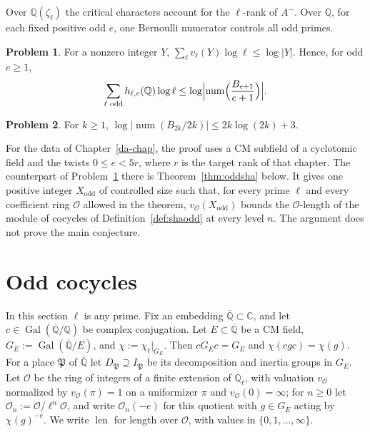 \documentclass[reqno]{amsart}
\newcounter{chap}
\theoremstyle{definition}
\newtheorem{problem}{Problem}[section]
\theoremstyle{plain}
\theoremstyle{remark}
\newcommand{\Q}{\mathbb{Q}}
\newcommand{\Ql}{\Q_\ell}
\newcommand{\Oc}{\mathcal{O}}
\newcommand{\Gal}{\operatorname{Gal}}
\newcommand{\len}{\operatorname{len}}
\newcommand{\num}{\operatorname{num}}
\begin{document}
Over \(\Q(\zeta_\ell)\) the critical characters account for the \(\ell\)-rank of \(A^-\).  Over \(\Q\), for each fixed positive odd \(e\), one Bernoulli numerator controls all odd primes.

\begin{problem}\label{pr:one-number}
For a nonzero integer \(Y\), \(\sum_\ell v_\ell(Y) \log \ell \le \log \lvert Y \rvert\).  Hence, for odd \(e \ge 1\),
\[
  \sum_{\ell \text{ odd}} h_{\ell,e}(\Q) \log \ell \le \log \Bigl\lvert \num\Bigl(\frac{B_{e+1}}{e+1}\Bigr) \Bigr\rvert .
\]
\end{problem}

\begin{problem}\label{pr:bernoulli-size}
For \(k \ge 1\), \(\log \lvert \num(B_{2k}/2k) \rvert \le 2k \log(2k) + 3\).
\end{problem}

For the data of Chapter~\ref{da-chap}, the proof uses a CM subfield of a cyclotomic field and the twists \(0 \le e < 5r\), where \(r\) is the target rank of that chapter.  The counterpart of Problem~\ref{pr:one-number} there is Theorem~\ref{thm:oddsha} below.  It gives one positive integer \(X_{\mathrm{odd}}\) of controlled size such that, for every prime \(\ell\) and every coefficient ring \(\Oc\) allowed in the theorem, \(v_\Oc(X_{\mathrm{odd}})\) bounds the \(\Oc\)-length of the module of cocycles of Definition~\ref{def:shaodd} at every level \(n\).  The argument does not prove the main conjecture.

\section{Odd cocycles}\label{sec:odd}

In this section \(\ell\) is any prime.  Fix an embedding \(\overline{\Q} \subset \mathbb{C}\), and let \(c \in \Gal(\overline{\Q}/\Q)\) be complex conjugation.  Let \(E \subset \overline{\Q}\) be a CM field, \(G_E := \Gal(\overline{\Q}/E)\), and \(\chi := \chi_\ell|_{G_E}\).  Then \(c G_E c = G_E\) and \(\chi(cgc) = \chi(g)\).  For a place \(\mathfrak{P}\) of \(\overline{\Q}\) let \(D_{\mathfrak{P}} \supseteq I_{\mathfrak{P}}\) be its decomposition and inertia groups in \(G_E\).  Let \(\Oc\) be the ring of integers of a finite extension of \(\Ql\), with valuation \(v_\Oc\) normalized by \(v_\Oc(\pi) = 1\) on a uniformizer \(\pi\) and \(v_\Oc(0) = \infty\); for \(n \ge 0\) let \(\Oc_n := \Oc/\ell^n\Oc\), and write \(\Oc_n(-e)\) for this quotient with \(g \in G_E\) acting by \(\chi(g)^{-e}\).  We write \(\len\) for length over \(\Oc\), with values in \(\{0, 1, \dots, \infty\}\).
\end{document}
